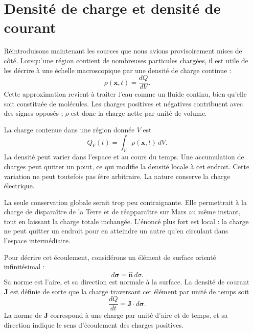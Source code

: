 \section{Densité de charge et densité de courant}

Réintroduisons maintenant les sources que nous avions provisoirement mises de côté. Lorsqu’une région contient de nombreuses particules chargées, il est utile de les décrire à une échelle macroscopique par une densité de charge continue :
\begin{equation}
\rho(\mathbf x,t)=\frac{dQ}{dV}.
\end{equation}
Cette approximation revient à traiter l’eau comme un fluide continu, bien qu’elle soit constituée de molécules. Les charges positives et négatives contribuent avec des signes opposés ; \(\rho\) est donc la charge nette par unité de volume.

La charge contenue dans une région donnée \(V\) est
\begin{equation}
Q_V(t)=\int_V\rho(\mathbf x,t)\,dV.
\label{eq:charge-volume}
\end{equation}
La densité peut varier dans l’espace et au cours du temps. Une accumulation de charges peut quitter un point, ce qui modifie la densité locale à cet endroit. Cette variation ne peut toutefois pas être arbitraire. La nature conserve la charge électrique.

La seule conservation globale serait trop peu contraignante. Elle permettrait à la charge de disparaître de la Terre et de réapparaître sur Mars au même instant, tout en laissant la charge totale inchangée. L’énoncé plus fort est local : la charge ne peut quitter un endroit pour en atteindre un autre qu’en circulant dans l’espace intermédiaire.

Pour décrire cet écoulement, considérons un élément de surface orienté infinitésimal :
\begin{equation}
d\boldsymbol\sigma=\widehat{\mathbf n}\,d\sigma.
\end{equation}
Sa norme est l’aire, et sa direction est normale à la surface. La densité de courant \(\mathbf J\) est définie de sorte que la charge traversant cet élément par unité de temps soit
\begin{equation}
\frac{dQ}{dt}=\mathbf J\cdot d\boldsymbol\sigma.
\label{eq:current-flux-element}
\end{equation}
La norme de \(\mathbf J\) correspond à une charge par unité d’aire et de temps, et sa direction indique le sens d’écoulement des charges positives.

